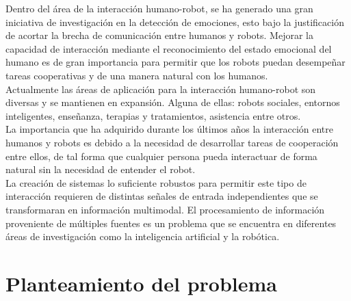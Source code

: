 \documentclass[12pt,oneside]{book}
\begin{document}

Dentro del área de la interacción humano-robot, se ha generado una gran iniciativa de investigación en la detección de emociones, esto bajo la justificación de acortar la brecha de comunicación entre humanos y robots. Mejorar la capacidad de interacción mediante el reconocimiento del estado emocional del humano es de gran importancia para permitir que los robots puedan desempeñar tareas cooperativas y de una manera natural con los humanos.\\

 Actualmente las áreas de aplicación para la interacción humano-robot son diversas y se mantienen en expansión. Alguna de ellas: robots sociales, entornos inteligentes, enseñanza, terapias y tratamientos, asistencia entre otros. \\

 La importancia que ha adquirido durante los últimos años la interacción entre humanos y robots es debido a la necesidad de desarrollar tareas de cooperación entre ellos, de tal forma que cualquier persona pueda interactuar de forma natural sin la necesidad de entender el robot.\\

 La creación de sistemas lo suficiente robustos para permitir este tipo de interacción requieren de distintas señales de entrada independientes que se transformaran en información multimodal. El procesamiento de información proveniente de múltiples fuentes es un problema que se encuentra en diferentes áreas de investigación como la inteligencia artificial y la robótica.


   
\afterpreface 

\pagestyle{fancyplain}
\renewcommand{\chaptermark}[1]{\markboth{#1}{\textsc{\footnotesize\thechapter\ #1}}}
\renewcommand{\sectionmark}[1]{\markright{\textsc{\footnotesize\thesection\ #1}}}
\lhead[\fancyplain{}{\textsc{\footnotesize\thepage}}]%
{\fancyplain{}{\rightmark}}
\rhead[\fancyplain{}{\leftmark}]%
{\fancyplain{}{\textsc{\footnotesize\thepage}}} \cfoot{}

\mainmatter
  
\chapter{Planteamiento del problema}
\end{document}
